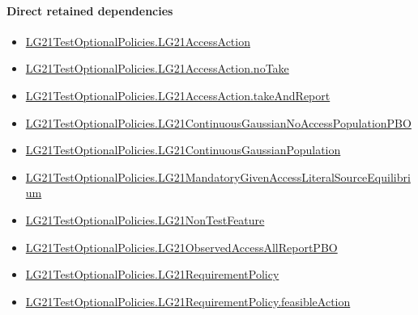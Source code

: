 \documentclass[10pt]{article}
\begin{document}
\paragraph{Direct retained dependencies}
\begin{itemize}\raggedright
\item \hyperlink{governing-declaration-90deccb685e0d8b3}{LG21\allowbreak{}Test\allowbreak{}Optional\allowbreak{}Policies.\allowbreak{}LG21\allowbreak{}Access\allowbreak{}Action}
\item \hyperlink{governing-declaration-3ab7bf5578869b36}{LG21\allowbreak{}Test\allowbreak{}Optional\allowbreak{}Policies.\allowbreak{}LG21\allowbreak{}Access\allowbreak{}Action.\allowbreak{}no\allowbreak{}Take}
\item \hyperlink{governing-declaration-ed459ca7da909742}{LG21\allowbreak{}Test\allowbreak{}Optional\allowbreak{}Policies.\allowbreak{}LG21\allowbreak{}Access\allowbreak{}Action.\allowbreak{}take\allowbreak{}And\allowbreak{}Report}
\item \hyperlink{governing-declaration-625eb26543c1b3dc}{LG21\allowbreak{}Test\allowbreak{}Optional\allowbreak{}Policies.\allowbreak{}LG21\allowbreak{}Continuous\allowbreak{}Gaussian\allowbreak{}No\allowbreak{}Access\allowbreak{}Population\allowbreak{}PBO}
\item \hyperlink{paper-prerequisite-f5e1c886d250142b}{LG21\allowbreak{}Test\allowbreak{}Optional\allowbreak{}Policies.\allowbreak{}LG21\allowbreak{}Continuous\allowbreak{}Gaussian\allowbreak{}Population}
\item \hyperlink{governing-declaration-97e3a6cd16347ca5}{LG21\allowbreak{}Test\allowbreak{}Optional\allowbreak{}Policies.\allowbreak{}LG21\allowbreak{}Mandatory\allowbreak{}Given\allowbreak{}Access\allowbreak{}Literal\allowbreak{}Source\allowbreak{}Equilibrium}
\item \hyperlink{governing-declaration-81cb73bf3869c56d}{LG21\allowbreak{}Test\allowbreak{}Optional\allowbreak{}Policies.\allowbreak{}LG21\allowbreak{}Non\allowbreak{}Test\allowbreak{}Feature}
\item \hyperlink{governing-declaration-40675d24dce42b58}{LG21\allowbreak{}Test\allowbreak{}Optional\allowbreak{}Policies.\allowbreak{}LG21\allowbreak{}Observed\allowbreak{}Access\allowbreak{}All\allowbreak{}Report\allowbreak{}PBO}
\item \hyperlink{paper-prerequisite-c372c1ea09b2ca97}{LG21\allowbreak{}Test\allowbreak{}Optional\allowbreak{}Policies.\allowbreak{}LG21\allowbreak{}Requirement\allowbreak{}Policy}
\item \hyperlink{paper-prerequisite-4ddc997ac8f43233}{LG21\allowbreak{}Test\allowbreak{}Optional\allowbreak{}Policies.\allowbreak{}LG21\allowbreak{}Requirement\allowbreak{}Policy.\allowbreak{}feasible\allowbreak{}Action}

\end{itemize}
\end{document}
